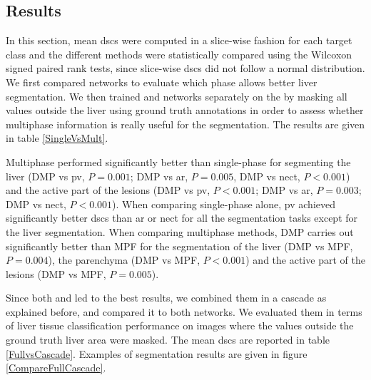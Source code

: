 

\subsection{Results}

In this section, mean \ac{dsc}s were computed in a slice-wise fashion for each target class and the different methods were statistically compared using the Wilcoxon 
signed paired rank tests, since slice-wise \ac{dsc}s did not follow a normal distribution. 
We first compared  networks
 to evaluate which phase allows better liver segmentation. 
 We then trained  and   networks separately on the \textbf{} by masking all values outside the liver using ground truth annotations in order to assess whether multiphase information is really useful for the segmentation. The results are given in table \ref{SingleVsMult}.

Multiphase performed significantly better than single-phase for segmenting the liver (DMP vs \ac{pv}, $P=0.001$; DMP vs \ac{ar}, $P=0.005$, DMP vs \ac{nect}, $P<0.001$) and the active part of the lesions (DMP vs \ac{pv}, $P<0.001$; DMP vs \ac{ar}, $P=0.003$; DMP vs \ac{nect}, $P<0.001$). When comparing single-phase alone, \ac{pv} achieved significantly better \ac{dsc}s than \ac{ar} or \ac{nect} for all the segmentation tasks except for the liver segmentation. When comparing multiphase methods, DMP carries out significantly better than MPF for the segmentation of the liver (DMP vs MPF, $P=0.004$), the parenchyma (DMP vs MPF, $P<0.001$) and the active part of the lesions (DMP vs MPF, $P=0.005$).

Since both  and  led to the best results, we combined them in a cascade as explained before, and compared it to both  networks. We evaluated them in terms of liver tissue classification performance on images where the values outside the ground truth liver area were masked. The mean \ac{dsc}s are reported in table \ref{FullvsCascade}. Examples of segmentation results are given in figure \ref{CompareFullCascade}. \\

